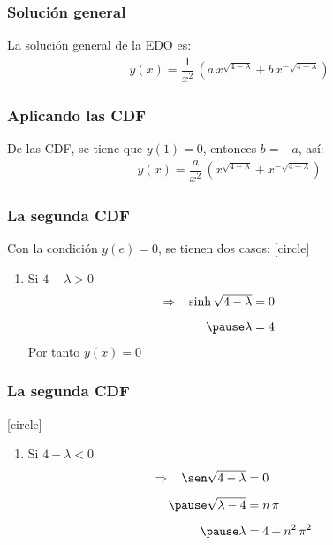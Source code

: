 \documentclass[12pt]{beamer}
\begin{document}
\begin{frame}
\frametitle{Solución general}
La solución general de la EDO es:
\pause
\begin{align*}
y (x) = \dfrac{1}{x^{2}} \, \left( a \, x^{\sqrt{4 - \lambda}} + b \, x^{- \sqrt{4 - \lambda}} \right)
\end{align*}
\end{frame}
\begin{frame}
\frametitle{Aplicando las CDF}
De las CDF, se tiene que $y (1) = 0$, \pause entonces $b = -a$, así:
\pause
\begin{align*}
y (x) = \dfrac{a}{x^{2}} \, \left( x^{\sqrt{4 - \lambda}} + x^{- \sqrt{4 - \lambda}} \right)
\end{align*}
\end{frame}
\begin{frame}
\frametitle{La segunda CDF}
Con la condición $y(e) = 0$, se tienen dos casos:
\pause
{}
[circle]
\begin{enumerate}[<+->]
\item Si $4 - \lambda > 0$
\pause
\begin{eqnarray*}
\begin{aligned}
\hspace*{-3cm} \Rightarrow \hspace{0.3cm} \sinh \sqrt{4 - \lambda} &= 0 \\[0.5em] \pause 
\lambda &= 4
\end{aligned}
\end{eqnarray*}
\pause
Por tanto $y (x) = 0$
\seti
\end{enumerate}
\end{frame}
\begin{frame}
\frametitle{La segunda CDF}
[circle]
\begin{enumerate}[<+->]
\conti
\item Si $4 - \lambda < 0$
\pause
\begin{eqnarray*}
\begin{aligned}
\hspace*{-3cm} \Rightarrow \hspace{0.3cm} \sen \sqrt{4 - \lambda} &= 0 \\[0.5em] \pause 
\sqrt{\lambda - 4} &= n \, \pi \\[0.5em] \pause
\lambda &= 4 + n^{2} \, \pi^{2}
\end{aligned}
\end{eqnarray*}
\end{enumerate}
\end{frame}
\end{document}
